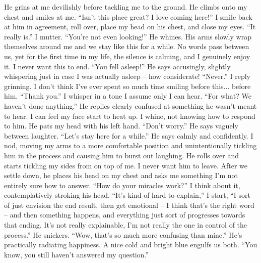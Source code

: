 \documentclass[openany, 12pt]{book}
\newcommand\tab[1][1cm]{\hspace*{#1}}
\begin{document}
\newline
\tab
He grins at me devilishly before tackling me to the ground. He climbs onto my chest and smiles at me. ``Isn’t this place great? I love coming here!''
\newline
\tab
I smile back at him in agreement, roll over, place my head on his chest, and close my eyes. ``It really is.'' I mutter.
\newline
\tab
``You’re not even looking!'' He whines. His arms slowly wrap themselves around me and we stay like this for a while. No words pass between us, yet for the first time in my life, the silence is calming, and I genuinely enjoy it. I never want this to end.  ``You fell asleep!'' He says accusingly, slightly whispering just in case I was actually asleep -- how considerate!
\newline
\tab
``Never.'' I reply grinning. I don’t think I’ve ever spent so much time smiling before this... before him.  ``Thank you.'' I whisper in a tone I assume only I can hear.  
\newline
\tab
``For what? We haven’t done anything.'' He replies clearly confused at something he wasn’t meant to hear. I can feel my face start to heat up.
\newline
\tab
I whine, not knowing how to respond to him. He pats my head with his left hand. ``Don’t worry.'' He says vaguely between laughter. ``Let’s stay here for a while.'' He says calmly and confidently. I nod, moving my arms to a more comfortable position and unintentionally tickling him in the process and causing him to burst out laughing. He rolls over and starts tickling my sides from on top of me. I never want him to leave.
\newline
\tab
After we settle down, he places his head on my chest and asks me something I’m not entirely sure how to answer. ``How do your miracles work?''
\newline
\tab
I think about it, contemplatively stroking his head. ``It’s kind of hard to explain,'' I start, ``I sort of just envision the end result, then get emotional -- I think that’s the right word -- and then something happens, and everything just sort of progresses towards that ending. It’s not really explainable, I’m not really the one in control of the process.''
\newline
\tab
He snickers. ``Wow, that’s so much more confusing than mine.'' He’s practically radiating happiness. A nice cold and bright blue engulfs us both.
\newline
\tab
``You know, you still haven’t answered my question.''
\end{document}
